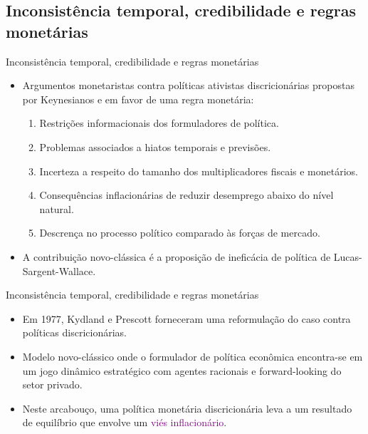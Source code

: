 \documentclass[10pt]{beamer}
\begin{document}
\subsection{Inconsistência temporal, credibilidade e regras monetárias}
\begin{frame}{Inconsistência temporal, credibilidade e regras monetárias}
    \begin{itemize}
        \item Argumentos monetaristas contra políticas ativistas discricionárias propostas por Keynesianos e em favor de uma regra monetária:
        \bigskip
        \begin{enumerate}
            \item Restrições informacionais dos formuladores de política.
            \bigskip
            \item Problemas associados a hiatos temporais e previsões.
            \bigskip
            \item Incerteza a respeito do tamanho dos multiplicadores fiscais e monetários.
            \bigskip
            \item Consequências inflacionárias de reduzir desemprego abaixo do nível natural.
            \bigskip
            \item Descrença no processo político comparado às forças de mercado.
        \end{enumerate}
        \bigskip
        \item A contribuição novo-clássica é a proposição de ineficácia de política de Lucas-Sargent-Wallace.
    \end{itemize}
\end{frame}

\begin{frame}{Inconsistência temporal, credibilidade e regras monetárias}
    \begin{itemize}
        \item Em 1977, Kydland e Prescott forneceram uma reformulação do caso contra políticas discricionárias.
        \bigskip
        \item Modelo novo-clássico onde o formulador de política econômica encontra-se em um jogo dinâmico estratégico com agentes racionais e forward-looking do setor privado.
        \bigskip
        \item Neste arcabouço, uma política monetária discricionária leva a um resultado de equilíbrio que envolve um \textcolor{purple}{viés inflacionário}.
    \end{itemize}
\end{frame}
\end{document}
